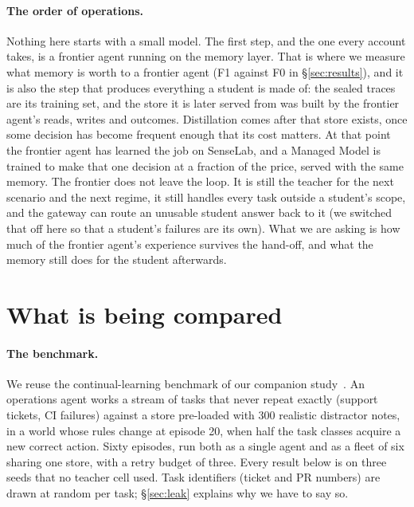 \documentclass[11pt]{article}
\newcommand{\cond}[1]{\textsf{#1}}
\begin{document}
\paragraph{The order of operations.} Nothing here starts with a small model. The first
step, and the one every account takes, is a frontier agent running on the memory layer.
That is where we measure what memory is worth to a frontier agent (\cond{F1} against
\cond{F0} in \S\ref{sec:results}), and it is also the step that produces everything a
student is made of: the sealed traces are its training set, and the store it is later
served from was built by the frontier agent's reads, writes and outcomes. Distillation comes
after that store exists, once some decision has become frequent enough that its cost
matters. At that point the frontier agent has learned the job on SenseLab, and a Managed
Model is trained to make that one decision at a fraction of the price, served with the same
memory. The frontier does not leave the loop. It is still the teacher for the next scenario
and the next regime, it still handles every task outside a student's scope, and the gateway
can route an unusable student answer back to it (we switched that off here so that a
student's failures are its own). What we are asking is how much of the frontier agent's
experience survives the hand-off, and what the memory still does for the student afterwards.

\section{What is being compared}
\label{sec:conditions}

\paragraph{The benchmark.} We reuse the continual-learning benchmark of our companion
study~\cite{memory-not-learning}. An operations agent works a stream of tasks that never
repeat exactly (support tickets, CI failures) against a store pre-loaded with 300 realistic
distractor notes, in a world whose rules change at episode 20, when half the task classes
acquire a new correct action. Sixty episodes, run both as a single agent and as a fleet of
six sharing one store, with a retry budget of three. Every result below is on three seeds
that no teacher cell used. Task identifiers (ticket and PR numbers) are drawn at random per
task; \S\ref{sec:leak} explains why we have to say so.
\end{document}
